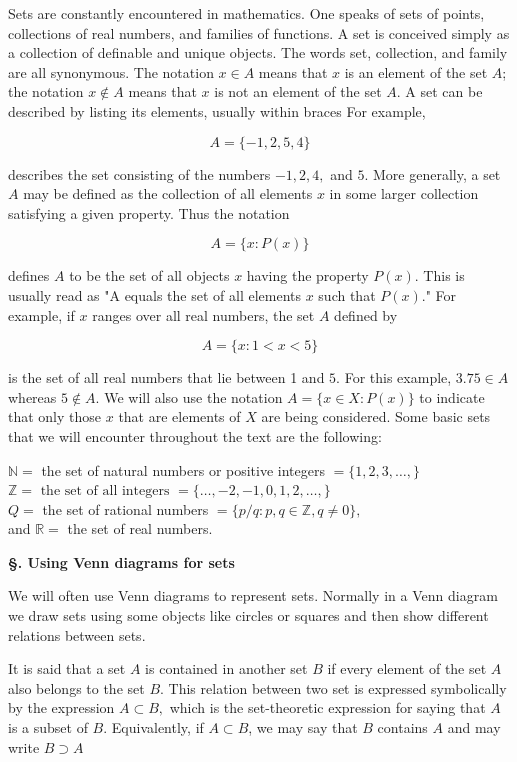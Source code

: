 \documentclass[ 11pt,%
				a4paper,%
				oneside,%
				headinclude,%
				footinclude = true,%
				cleardoublepage = empty,%
				reqno]{scrbook}
\begin{document}
Sets are constantly encountered in mathematics. One speaks of sets of points, collections of real numbers, and families of functions. A set is conceived simply as a collection of definable and unique objects. The words set, collection, and family are all synonymous. The notation $x \in A$ means that $x$ is an element of the set $A$; the notation $x \notin A$ means that $x$ is not an element of the set $A$. A set can be described by listing its elements, usually within braces For
example,

\[
A=\{-1,2,5,4\}
\]

describes the set consisting of the numbers $-1,2,4,$ and $5 .$ More generally, a set $A$ may be defined as the collection of all elements $x$ in some larger collection satisfying a given property. Thus the notation

\[
A=\{x: P(x)\}
\]

defines $A$ to be the set of all objects $x$ having the property $P(x)$. This is usually read as "A equals the set of all elements $x$ such that $P(x)$." For example, if $x$ ranges over all real numbers, the set $A$ defined by

\[
A=\{x: 1<x<5\}
\]

is the set of all real numbers that lie between 1 and $5 .$ For this example, $3.75 \in A$ whereas $5 \notin A .$ We will also use the notation $A=\{x \in X: P(x)\}$ to indicate that only those $x$ that are elements of $X$ are being considered. Some basic sets that we will encounter throughout the text are the following:

$\mathbb{N}=$ the set of natural numbers or positive integers $=\{1,2,3, \ldots,\}$ \\
$\mathbb{Z}=\text { the set of all integers }=\{\ldots,-2,-1,0,1,2, \ldots,\}$\\
$Q=$ the set of rational numbers $=\{p / q: p, q \in \mathbb{Z}, q \neq 0\},$ \\
and $\mathbb{R}=$ the set of real numbers.


\textbf{\S. Using Venn diagrams for sets}

We will often use Venn diagrams to represent sets. Normally in a Venn diagram we draw sets using some objects like circles or squares and then show different relations between sets. 

\begin{definition}[Containment]
	It is said that a set $A$ is contained in another set $B$ if every element of the set $A$ also belongs to the set $B$. This relation between two set is expressed symbolically by the expression $A \subset B,$ which is the set-theoretic expression for saying that $A$ is a subset of $B$. Equivalently, if $A \subset B$, we may say that $B$ contains $A$ and may write $B \supset A$
\end{definition}
\end{document}
